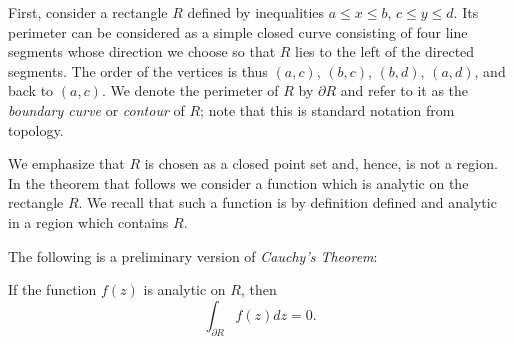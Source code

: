 First, consider a rectangle $R$ defined by inequalities $a \leq x \leq b$, $c \leq y \leq d$. Its perimeter can be considered as a simple closed curve consisting of four line segments whose direction we choose so that $R$ lies to the left of the directed segments. The order of the vertices is thus $(a,c)$, $(b,c)$, $(b,d)$, $(a,d)$, and back to $(a,c)$. We denote the perimeter of $R$ by $\partial R$ and refer to it as the \emph{boundary curve} or \emph{contour} of $R$; note that this is standard notation from topology.

We emphasize that $R$ is chosen as a closed point set and, hence, is not a region. In the theorem that follows we consider a function which is analytic on the rectangle $R$. We recall that such a function is by definition defined and analytic in a region which contains $R$.

The following is a preliminary version of \emph{Cauchy's Theorem}:
\begin{theorem}[Cauchy]
\label{thm:cauchy-rectangle}
If the function $f(z)$ is analytic on $R$, then $$\int_{\partial R} f(z)dz=0.$$
\end{theorem}

